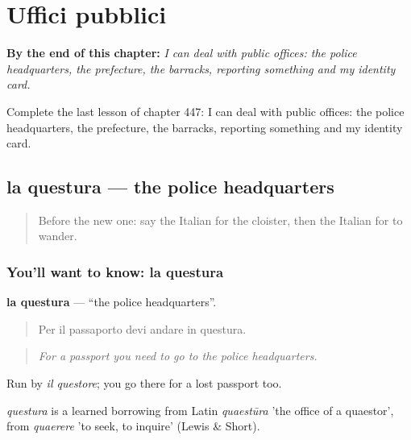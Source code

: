 
\chapter{Uffici pubblici}
\label{ch:it-uffici-pubblici}

\begin{chapteropening}
\textbf{By the end of this chapter:} \emph{I can deal with public offices: the police headquarters, the prefecture, the barracks, reporting something and my identity card.}

Complete the last lesson of chapter 447: I can deal with public offices: the police headquarters, the prefecture, the barracks, reporting something and my identity card.
\end{chapteropening}

\section[la questura]{la questura — the police headquarters}

\label{lesson:IT-C447-questura}



\begin{quote}
Before the new one: say the Italian for the cloister, then the Italian for to wander.
\end{quote}

\subsection*{You'll want to know: la questura}
\textbf{la questura} — \textquotedblleft{}the police headquarters\textquotedblright{}.

\begin{quote}
Per il passaporto devi andare in questura.
\end{quote}

\begin{quote}
\emph{For a passport you need to go to the police headquarters.}
\end{quote}

Run by \emph{il questore}; you go there for a lost passport too.

\begin{cousinweb}
\emph{questura} is a learned borrowing from Latin \emph{quaestūra} 'the office of a quaestor', from \emph{quaerere} 'to seek, to inquire' (Lewis \& Short).
\end{cousinweb}

